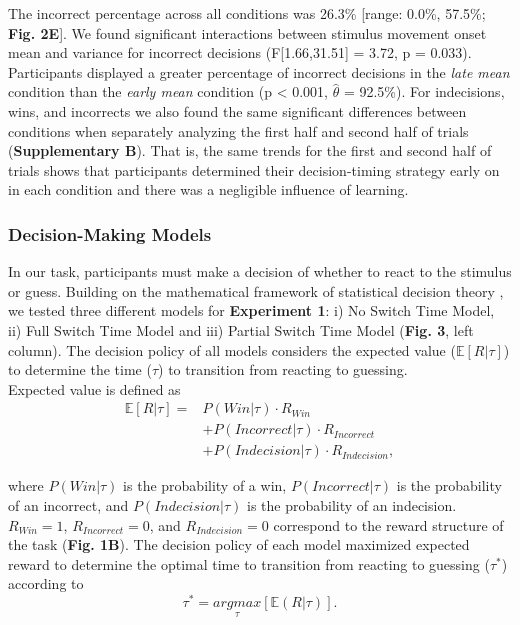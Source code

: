 \documentclass[man,donotrepeattitle,floatsintext,letterpaper,12pt]{apa7}
\newcommand\boldblue[1]{\textcolor{mydarkblue}{\textbf{#1}}}
\begin{document}
The incorrect percentage across all conditions was 26.3\% [range: 0.0\%, 57.5\%; \boldblue{Fig. 2E}]. We found significant interactions between stimulus movement onset mean and variance for incorrect decisions (F[1.66,31.51] = 3.72, p = 0.033). Participants displayed a greater percentage of incorrect decisions in the \emph{late mean} condition than the \emph{early mean} condition (p < 0.001, $\hat{\theta}$ = 92.5\%). 
For indecisions, wins, and incorrects we also found the same significant differences between conditions when separately analyzing the first half and second half of trials (\boldblue{Supplementary B}). 
That is, the same trends for the first and second half of trials shows that participants determined their decision-timing strategy early on in each condition and there was a negligible influence of learning.

\vspace{2mm}
\subsubsection{Decision-Making Models}

\noindent In our task, participants must make a decision of whether to react to the stimulus or guess. Building on the mathematical framework of statistical decision theory \autocite{trommershauserStatisticalDecisionTheory2003}, we tested three different models for \boldblue{Experiment 1}: i) No Switch Time Model, ii) Full Switch Time Model and iii) Partial Switch Time Model (\boldblue{Fig. 3}, left column). The decision policy of all models considers the expected value ($\mathbb{E}[R|\tau]$) to determine the time ($\tau$) to transition from reacting to guessing. 
\\
\noindent Expected value is defined as
\setlength{\belowdisplayskip}{4pt} \setlength{\belowdisplayshortskip}{4pt} %
\setlength{\abovedisplayskip}{4pt} \setlength{\abovedisplayshortskip}{4pt}
\begin{align}
    \mathbb{E}[R|\tau] = & P(Win|\tau) \cdot R_{Win} \nonumber \\ &+ P(Incorrect|\tau) \cdot R_{Incorrect} \nonumber \\ &+ P(Indecision|\tau) \cdot R_{Indecision},
\end{align}

\noindent where $P(Win|\tau)$ is the probability of a win, $P(Incorrect|\tau)$ is the probability of an incorrect, and $P(Indecision|\tau)$ is the probability of an indecision. $R_{Win} = 1$, $R_{Incorrect} = 0$, and $R_{Indecision} = 0$ correspond to the reward structure of the task (\boldblue{Fig. 1B}). The decision policy of each model maximized expected reward to determine the optimal time to transition from reacting to guessing ($\tau^*$) according to
\begin{equation}
    \tau^* = \underset{\tau}{argmax}[\mathbb{E}(R|\tau)].
\end{equation}
\end{document}
